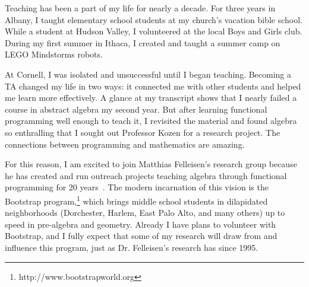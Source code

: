 \documentclass[12pt]{article}
\newcommand{\hdr}[2]{\vspace{-0.4cm}{\flushleft{\hrulefill\\\textbf{#1}\hfill{#2}\\\vspace{-0.2cm}\hrulefill}}\vspace{0.1cm}}
\begin{document}
\hdr{Broader Impacts}{}

Teaching has been a part of my life for nearly a decade.
For three years in Albany, I taught elementary school students at my church's vacation bible school.
While a student at Hudson Valley, I volunteered at the local Boys and Girls club.
During my first summer in Ithaca, I created and taught a summer camp on LEGO Mindstorms robots.

At Cornell, I was isolated and unsuccessful until I began teaching.
Becoming a TA changed my life in two ways: it connected me with other students and helped me learn more effectively.
A glance at my transcript shows that I nearly failed a course in abstract algebra my second year.
But after learning functional programming well enough to teach it, I revisited the material and found algebra so enthralling that I sought out Professor Kozen for a research project.
The connections between programming and mathematics are amazing.

For this reason, I am excited to join Matthias Felleisen's research group because he has created and run outreach projects teaching algebra through functional programming for 20 years~\cite{felleisen2010teachscheme}.
The modern incarnation of this vision is the Bootstrap program,\footnote{http://www.bootstrapworld.org} which brings middle school students in dilapidated neighborhoods (Dorchester, Harlem, East Palo Alto, and many others) up to speed in pre-algebra and geometry.
Already I have plans to volunteer with Bootstrap, and I fully expect that some of my research will draw from and influence this program, just as Dr. Felleisen's research has since 1995.

\vfill
\renewcommand{\section}[2]{}
\begin{multicols}{2}
\footnotesize


\end{multicols}
\end{document}
